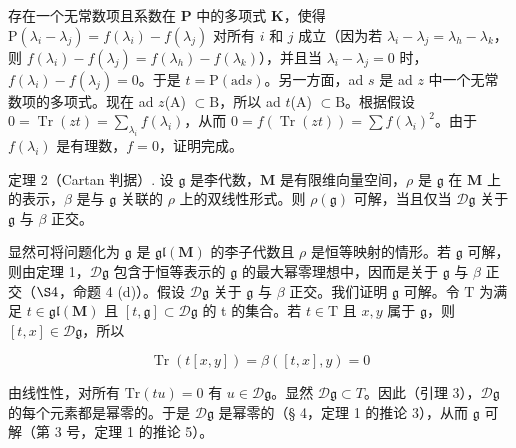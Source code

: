 存在一个无常数项且系数在 \(\mathbf{P}\) 中的多项式 \(\mathbf{K}\)，使得 \(\mathrm{P}(\lambda_i - \lambda_j) = f(\lambda_i) - f(\lambda_j)\) 对所有 \(i\) 和 \(j\) 成立（因为若 \(\lambda_i - \lambda_j = \lambda_h - \lambda_k\)，则 \(f(\lambda_i) - f(\lambda_j) = f(\lambda_h) - f(\lambda_k)\)），并且当 \(\lambda_i - \lambda_j = 0\) 时，\(f(\lambda_i) - f(\lambda_j) = 0\)。于是 \(t = \mathrm{P}(\mathrm{ad}s)\)。另一方面，ad \(s\) 是 ad \(z\) 中一个无常数项的多项式。现在 ad \(z\)(A) \(\subset \mathrm{B}\)，所以 ad \(t\)(A) \(\subset \mathrm{B}\)。根据假设 \(0 = \operatorname{Tr}(zt) = \sum_{\lambda_i} f(\lambda_i)\)，从而 \(0 = f(\operatorname{Tr}(zt)) = \sum f(\lambda_i)^2\)。由于 \(f(\lambda_i)\) 是有理数，\(f = 0\)，证明完成。

定理 2（Cartan 判据）. 设 \(\mathfrak{g}\) 是李代数，\(\mathbf{M}\) 是有限维向量空间，\(\rho\) 是 \(\mathfrak{g}\) 在 \(\mathbf{M}\) 上的表示，\(\beta\) 是与 \(\mathfrak{g}\) 关联的 \(\rho\) 上的双线性形式。则 \(\rho(\mathfrak{g})\) 可解，当且仅当 \(\mathcal{D}\mathfrak{g}\) 关于 \(\mathfrak{g}\) 与 \(\beta\) 正交。

显然可将问题化为 \(\mathfrak{g}\) 是 \(\mathfrak{gl}(\mathbf{M})\) 的李子代数且 \(\rho\) 是恒等映射的情形。若 \(\mathfrak{g}\) 可解，则由定理 1，\(\mathcal{D}\mathfrak{g}\) 包含于恒等表示的 \(\mathfrak{g}\) 的最大幂零理想中，因而是关于 \(\mathfrak{g}\) 与 \(\beta\) 正交（\(\S 4\)，命题 4 (d)）。假设 \(\mathcal{D}\mathfrak{g}\) 关于 \(\mathfrak{g}\) 与 \(\beta\) 正交。我们证明 \(\mathfrak{g}\) 可解。令 \(\mathrm{T}\) 为满足 \(t\in \mathfrak{gl}(\mathbf{M})\) 且 \([t,\mathfrak{g}]\subset \mathcal{D}\mathfrak{g}\) 的 t 的集合。若 \(t\in \mathrm{T}\) 且 \(x,y\) 属于 \(\mathfrak{g}\)，则 \([t,x]\in \mathcal{D}\mathfrak{g}\)，所以

\[
\operatorname{Tr} (t [ x, y ]) = \beta ([ t, x ], y) = 0
\]

由线性性，对所有 \(\mathrm{Tr}(tu) = 0\) 有 \(u\in \mathcal{D}\mathfrak{g}\)。显然 \(\mathcal{D}\mathfrak{g}\subset T\)。因此（引理 3），\(\mathcal{D}\mathfrak{g}\) 的每个元素都是幂零的。于是 \(\mathcal{D}\mathfrak{g}\) 是幂零的（§ 4，定理 1 的推论 3），从而 \(\mathfrak{g}\) 可解（第 3 号，定理 1 的推论 5）。

